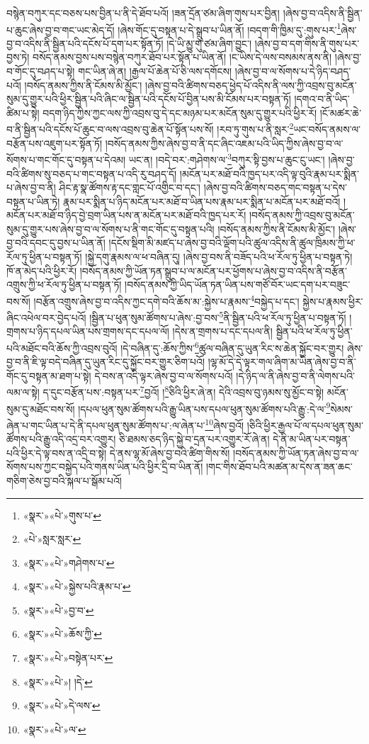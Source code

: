 བསྙེན་བཀུར་དང་བཅས་པས་བྱིན་པ་ནི་དེ་ཐོབ་པའོ། །ཟན་དྲོན་ཙམ་ཞིག་གུས་པར་བྱིན། །ཞེས་བྱ་བ་འདིས་ནི་སྦྱིན་པ་ཆུང་ཞེས་བྱ་བ་གང་ཡང་མེད་དོ། །ཞེས་གོང་དུ་བསྟན་པ་དེ་སྒྲུབ་པ་ཡིན་ནོ། །བདག་གི་ཁྱིམ་དུ་:གུས་པར་\footnote{«སྣར་»«པེ་»གུས་པ་}ཞེས་བྱ་བ་འདིས་ནི་སྦྱིན་པའི་དངོས་པོ་དག་པར་སྟོན་ཏོ། །དེ་ཡི་མྱུ་གུ་ཙམ་ཞིག་བྱུང་། །ཞེས་བྱ་བ་དག་གིས་ནི་གུས་པར་བྱས་ཏེ། བསོད་ནམས་བྱས་པས་བསྙེན་བཀུར་ཐོབ་པར་སྟོན་པ་ཡིན་ནོ། །ང་ཡིས་དེ་ལས་བསམས་ནས་ནི། །ཞེས་བྱ་བ་གོང་དུ་བཤད་པ་སྟེ། གང་ཡིན་ཞེ་ན། །རྒྱལ་པོ་ཆེན་པོ་ཅི་ལས་དགོངས། །ཞེས་བྱ་བ་ལ་སོགས་པ་དེ་ཉིད་བཤད་པའོ། །བསོད་ནམས་ཀྱིས་ནི་ངོམས་མི་མྱོང་། །ཞེས་བྱ་བའི་ཚིགས་བཅད་ཕྱེད་པོ་འདིས་ནི་ལས་ཀྱི་འབྲས་བུ་མངོན་སུམ་དུ་གྱུར་པའི་ཕྱིར་སྦྱིན་པའི་ཞིང་ལ་སྦྱིན་པའི་དངོས་པོ་བྱིན་པས་མི་ངོམས་པར་བསྟན་ཏོ། །དགའ་བ་ནི་ཡིད་ཚིམ་པ་སྟེ། བདག་ཉིད་ཀྱིས་ཀྱང་ལས་ཀྱི་འབྲས་བུ་དེ་དང་མཉམ་པར་མངོན་སུམ་དུ་གྱུར་པའི་ཕྱིར་རོ། །ངོ་མཚར་ཆེ་བ་ནི་སྦྱིན་པའི་དངོས་པོ་ཆུང་བ་ལས་འབྲས་བུ་ཆེན་པོ་སྟོན་པས་སོ། །རབ་ཏུ་གུས་པ་ནི་སླར་\footnote{«པེ་»སླར་སླར་}ཡང་བསོད་ནམས་ལ་བརྩོན་པས་འཇུག་པར་སྟོན་ཏོ། །བསོད་ནམས་ཀྱིས་ཞེས་བྱ་བ་ནི་དང་ཞིང་འཇམ་པའི་ཡིད་ཀྱིས་ཞེས་བྱ་བ་ལ་སོགས་པ་གང་གོང་དུ་བསྟན་པ་དེའམ། ཡང་ན། །བདེ་བར་:གཤེགས་ལ་\footnote{«སྣར་»«པེ་»གཤེགས་པ་}བཀུར་སྟི་བྱས་པ་ཆུང་ངུ་ཡང་། །ཞེས་བྱ་བའི་ཚིགས་སུ་བཅད་པ་གང་བསྟན་པ་འདི་རུ་བཤད་དོ། །མངོན་པར་མཐོ་བའི་ཁྱད་པར་འདི་ལྟ་བུའི་རྣམ་པར་སྨིན་པ་ཞེས་བྱ་བ་ནི། ཤིང་རྟ་སྣ་ཚོགས་རྟ་དང་གླང་པོ་འགྱིང་བ་དང་། །ཞེས་བྱ་བའི་ཚིགས་བཅད་གང་བསྟན་པ་དེས་བསྟན་པ་ཡིན་ཏེ། རྣམ་པར་སྨིན་པ་ཉིད་མངོན་པར་མཐོ་བ་ཡིན་པས་རྣམ་པར་སྨིན་པ་མངོན་པར་མཐོ་བའོ། །མངོན་པར་མཐོ་བ་ཉིད་བྱེ་བྲག་ཡིན་པས་ན་མངོན་པར་མཐོ་བའི་ཁྱད་པར་རོ། །བསོད་ནམས་ཀྱི་འབྲས་བུ་མངོན་སུམ་དུ་གྱུར་པས་ཞེས་བྱ་བ་ལ་སོགས་པ་ནི་གང་གོང་དུ་བསྟན་པའི། །བསོད་ནམས་ཀྱིས་ནི་ངོམས་མི་མྱོང་། །ཞེས་བྱ་བའི་དབང་དུ་བྱས་པ་ཡིན་ནོ། །དངོས་སྡིག་མི་མཛད་པ་ཞེས་བྱ་བའི་ལྡོག་པའི་ཚུལ་འདིས་ནི་ཚུལ་ཁྲིམས་ཀྱི་ཕ་རོལ་ཏུ་ཕྱིན་པ་བསྟན་ཏོ། །སྐྱེ་དགུ་རྣམས་ལ་ཕ་བཞིན་དུ། །ཞེས་བྱ་བས་ནི་བཟོད་པའི་ཕ་རོལ་ཏུ་ཕྱིན་པ་བསྟན་ཏེ། ཁོ་ན་མེད་པའི་ཕྱིར་རོ། །བསོད་ནམས་ཀྱི་ཡོན་ཏན་སྒྲུབ་པ་ལ་མངོན་པར་ཕྱོགས་པ་ཞེས་བྱ་བ་འདིས་ནི་བརྩོན་འགྲུས་ཀྱི་ཕ་རོལ་ཏུ་ཕྱིན་པ་བསྟན་ཏོ། །བསོད་ནམས་ཀྱི་ཡིད་ཡོན་ཏན་ཡིན་པས་གཙོ་བོར་ཡང་དག་པར་བཟུང་བས་སོ། །བརྩོན་འགྲུས་ཞེས་བྱ་བ་འདིས་ཀྱང་དགེ་བའི་ཆོས་མ་:སྐྱེས་པ་རྣམས་\footnote{«སྣར་»«པེ་»སྐྱེས་པའི་རྣམ་པ་}བསྐྱེད་པ་དང་། སྐྱེས་པ་རྣམས་ཕྱིར་ཞིང་འཕེལ་བར་བྱེད་པའོ། །སྦྱིན་པ་ཕུན་སུམ་ཚོགས་པ་ཞེས་:བྱ་བས་\footnote{«སྣར་»«པེ་»བྱ་བ་}ནི་སྦྱིན་པའི་ཕ་རོལ་ཏུ་ཕྱིན་པ་བསྟན་ཏོ། །གྲགས་པ་ཉིད་དཔལ་ཡིན་པས་གྲགས་དང་དཔལ་ལོ། །དེས་ན་གྲགས་པ་དང་དཔལ་ནི། སྦྱིན་པའི་ཕ་རོལ་ཏུ་ཕྱིན་པའི་མཐོང་བའི་ཆོས་ཀྱི་འབྲས་བུའོ། །དེ་བཞིན་དུ་:ཆོས་ཀྱིས་\footnote{«སྣར་»«པེ་»ཆོས་ཀྱི་}ཚུལ་བཞིན་དུ་ཡུན་རིང་ས་ཆེན་སྐྱོང་བར་གྱུར། ཞེས་བྱ་བ་ནི་ཇི་ལྟ་བདེ་བཞིན་དུ་ཡུན་རིང་དུ་སྐྱོང་བར་གྱུར་ཅིག་པའོ། །ལྷ་མོ་དེ་དེ་ལྟར་གལ་ཞིག་མ་ཡིན་ཞེས་བྱ་བ་ནི་གོང་དུ་བསྟན་མ་ཐག་པ་སྟེ། དེ་བས་ན་འདི་ལྟར་ཞེས་བྱ་བ་ལ་སོགས་པའོ། །དེ་ཉིད་ལ་ནི་ཞེས་བྱ་བ་ནི་ལེགས་པའི་ལམ་ལ་སྟེ། ད་དུང་བརྩོན་པས་:བསྟན་པར་\footnote{«སྣར་»«པེ་»བསྟེན་པར་}བྱའོ། །\footnote{«སྣར་»«པེ་»། །དེ་}ཅིའི་ཕྱིར་ཞེ་ན། དེའི་འབྲས་བུ་ཉམས་སུ་མྱོང་བ་སྟེ། མངོན་སུམ་དུ་མཐོང་བས་སོ། །དཔལ་ཕུན་སུམ་ཚོགས་པའི་རྒྱུ་ཡིན་པས་དཔལ་ཕུན་སུམ་ཚོགས་པའི་རྒྱུ་:དེ་ལ་\footnote{«སྣར་»«པེ་»དེ་ལས་}སེམས་ཞེན་པ་གང་ཡིན་པ་དེ་ནི་དཔལ་ཕུན་སུམ་ཚོགས་པ་:ལ་ཞེན་པ་\footnote{«སྣར་»«པེ་»ལ་}ཞེས་བྱའོ། །ཅིའི་ཕྱིར་རྒྱལ་པོ་ལ་དཔལ་ཕུན་སུམ་ཚོགས་པའི་རྒྱུ་འདི་འདྲ་བར་འགྱུར། ཅི་ཐམས་ཅད་ཉིད་སྐྱེ་བ་དྲན་པར་འགྱུར་རོ་ཞེ་ན། དེ་ནི་མ་ཡིན་པར་བསྟན་པའི་ཕྱིར་དེ་ལྟ་བས་ན་འདྲི་བ་སྟེ། དེ་ནས་ལྷ་མོ་ཞེས་བྱ་བའི་ཚིག་གིས་སོ། །བསོད་ནམས་ཀྱི་ཡོན་ཏན་ཞེས་བྱ་བ་ལ་སོགས་པས་ཀྱང་བསྐྱེད་པའི་གནས་ཡིན་པའི་ཕྱིར་དྲི་བ་ཡིན་ནོ། །གང་གིས་ཐོབ་པའི་མཚན་མ་དེས་ན་ཟན་ཆང་གཅིག་ཅེས་བྱ་བའི་སྐལ་པ་སྒོམ་པའོ། 